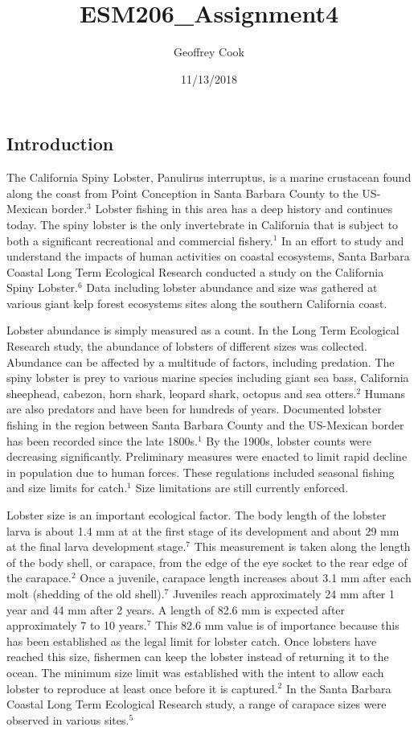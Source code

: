 \documentclass[]{article}
\title{ESM206\_Assignment4}
\author{Geoffrey Cook}
\date{11/13/2018}
\begin{document}
\maketitle

\subsection{Introduction}\label{introduction}

The California Spiny Lobster, Panulirus interruptus, is a marine
crustacean found along the coast from Point Conception in Santa Barbara
County to the US-Mexican border.\(^3\) Lobster fishing in this area has
a deep history and continues today. The spiny lobster is the only
invertebrate in California that is subject to both a significant
recreational and commercial fishery.\(^1\) In an effort to study and
understand the impacts of human activities on coastal ecosystems, Santa
Barbara Coastal Long Term Ecological Research conducted a study on the
California Spiny Lobster.\(^6\) Data including lobster abundance and
size was gathered at various giant kelp forest ecosystems sites along
the southern California coast.

Lobster abundance is simply measured as a count. In the Long Term
Ecological Research study, the abundance of lobsters of different sizes
was collected. Abundance can be affected by a multitude of factors,
including predation. The spiny lobster is prey to various marine species
including giant sea bass, California sheephead, cabezon, horn shark,
leopard shark, octopus and sea otters.\(^2\) Humans are also predators
and have been for hundreds of years. Documented lobster fishing in the
region between Santa Barbara County and the US-Mexican border has been
recorded since the late 1800s.\(^1\) By the 1900s, lobster counts were
decreasing significantly. Preliminary measures were enacted to limit
rapid decline in population due to human forces. These regulations
included seasonal fishing and size limits for catch.\(^1\) Size
limitations are still currently enforced.

Lobster size is an important ecological factor. The body length of the
lobster larva is about 1.4 mm at at the first stage of its development
and about 29 mm at the final larva development stage.\(^7\) This
measurement is taken along the length of the body shell, or carapace,
from the edge of the eye socket to the rear edge of the carapace.\(^2\)
Once a juvenile, carapace length increases about 3.1 mm after each molt
(shedding of the old shell).\(^7\) Juveniles reach approximately 24 mm
after 1 year and 44 mm after 2 years. A length of 82.6 mm is expected
after approximately 7 to 10 years.\(^7\) This 82.6 mm value is of
importance because this has been established as the legal limit for
lobster catch. Once lobsters have reached this size, fishermen can keep
the lobster instead of returning it to the ocean. The minimum size limit
was established with the intent to allow each lobster to reproduce at
least once before it is captured.\(^2\) In the Santa Barbara Coastal
Long Term Ecological Research study, a range of carapace sizes were
observed in various sites.\(^5\)
\end{document}

